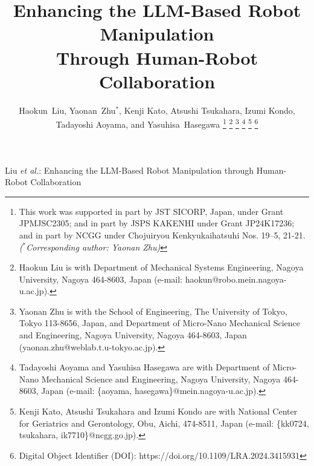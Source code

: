 \documentclass[letterpaper,conference]{ieeeconf}
\begin{document}
\title{\textbf{Enhancing the LLM-Based Robot Manipulation \\ Through Human-Robot Collaboration}}

\author{Haokun~Liu,
    Yaonan~Zhu$^{\ast}$, Kenji Kato, Atsushi Tsukahara, Izumi Kondo, \\ Tadayoshi Aoyama, and Yasuhisa~Hasegawa%
\thanks{This work was supported in part by JST SICORP, Japan, under Grant JPMJSC2305; and in part by JSPS KAKENHI under Grant JP24K17236; and in part by NCGG under Chojuiryou Kenkyukaihatsuhi Nos. 19–5, 21-21. \textit{($^{\ast}$Corresponding author: Yaonan Zhu)}}%
\thanks{Haokun Liu is with Department of Mechanical Systems Engineering, Nagoya University, Nagoya 464-8603, Japan (e-mail: haokun@robo.mein.nagoya-u.ac.jp).}
\thanks{Yaonan Zhu is with the School of Engineering, The University of Tokyo, Tokyo 113-8656, Japan, and Department of Micro-Nano Mechanical Science and Engineering, Nagoya University, Nagoya 464-8603, Japan (yaonan.zhu@weblab.t.u-tokyo.ac.jp).}
\thanks{Tadayoshi Aoyama and Yasuhisa Hasegawa are with Department of Micro-Nano Mechanical Science and Engineering, Nagoya University, Nagoya 464-8603, Japan (e-mail: \{aoyama, hasegawa\}@mein.nagoya-u.ac.jp).}
\thanks{Kenji Kato, Atsushi Tsukahara and Izumi Kondo are with National Center for Geriatrics and Gerontology, Obu, Aichi, 474-8511, Japan (e-mail: \{kk0724, tsukahara, ik7710\}@ncgg.go.jp).}
\thanks{Digital Object Identifier (DOI): https://doi.org/10.1109/LRA.2024.3415931}
}

%
{Liu \MakeLowercase{\textit{et al.}}: Enhancing the LLM-Based Robot Manipulation through Human-Robot Collaboration} 

\end{document}
